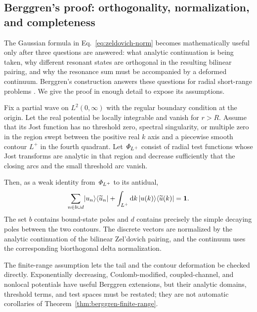 \subsection{Berggren's proof: orthogonality, normalization, and completeness}
\label{subsec:berggren-proof}

The Gaussian formula in Eq.~\eqref{eq:zeldovich-norm} becomes mathematically
useful only after three questions are answered: what analytic continuation is
being taken, why different resonant states are orthogonal in the resulting
bilinear pairing, and why the resonance sum must be accompanied by a deformed
continuum.  Berggren's construction answers these questions for radial
short-range problems
\cite{Berggren:1968zz,Michel:2009,MichelPloszajczak:2021}.  We give the
proof in enough detail to expose its assumptions.

\begin{theorem}
Fix a partial wave on $L^2(0,\infty)$ with the regular boundary condition at
the origin.  Let the real potential be locally integrable and vanish for
$r>R$.  Assume that its Jost function has no threshold zero, spectral
singularity, or multiple zero in the region swept between the positive real
$k$ axis and a piecewise smooth contour $L^+$ in the fourth quadrant.  Let
$\mathit{\Phi}_{L^+}$ consist of radial test functions whose Jost transforms are
analytic in that region and decrease sufficiently that the closing arcs and
the small threshold arc vanish.

Then, as a weak identity from $\mathit{\Phi}_{L^+}$ to its antidual,
\begin{equation}
  \sum_{n\in b\cup d}
  \lvert u_n \rangle\langle \widetilde u_n \rvert
  +\int_{L^+}\mathrm{d} k\,
  \lvert u(k) \rangle\langle \widetilde u(k) \rvert
  =\mathbf{1} .
  \label{eq:berggren-theorem-statement}
\end{equation}
The set $b$ contains bound-state poles and $d$ contains precisely the simple
decaying poles between the two contours.  The discrete vectors are normalized
by the analytic continuation of the bilinear Zel'dovich pairing, and the
continuum uses the corresponding biorthogonal delta normalization.
\label{thm:berggren-finite-range}
\end{theorem}

The finite-range assumption lets the tail and the contour deformation be
checked directly.  Exponentially decreasing, Coulomb-modified,
coupled-channel, and nonlocal potentials have useful Berggren extensions, but
their analytic domains, threshold terms, and test spaces must be restated;
they are not automatic corollaries of
Theorem~\ref{thm:berggren-finite-range}.

